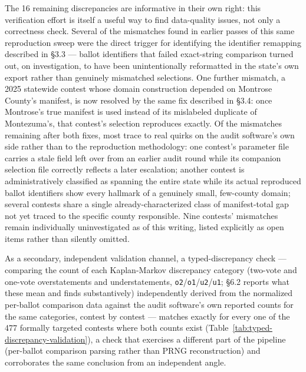 The 16 remaining discrepancies are informative in their own right: this
verification effort is itself a useful way to find data-quality issues, not
only a correctness check. Several of the mismatches found in earlier passes
of this same reproduction sweep were the direct trigger for identifying the
identifier remapping described in §3.3 — ballot identifiers that failed
exact-string comparison turned out, on investigation, to have been
unintentionally reformatted in the state's own export rather than genuinely
mismatched selections. One further mismatch, a 2025 statewide contest whose
domain construction depended on Montrose County's manifest, is now resolved
by the same fix described in §3.4: once Montrose's true manifest is used
instead of its mislabeled duplicate of Montezuma's, that contest's selection
reproduces exactly. Of the mismatches remaining after both fixes, most
trace to real quirks on the audit software's own side rather than to the reproduction
methodology: one contest's parameter file carries a stale field left over
from an earlier audit round while its companion selection file correctly
reflects a later escalation; another contest is administratively classified
as spanning the entire state while its actual reproduced ballot identifiers
show every hallmark of a genuinely small, few-county domain; several
contests share a single already-characterized class of manifest-total gap
not yet traced to the specific county responsible. Nine contests' mismatches
remain individually uninvestigated as of this writing, listed explicitly as
open items rather than silently omitted.

As a secondary, independent validation channel, a typed-discrepancy check —
comparing the count of each Kaplan-Markov discrepancy category (two-vote
and one-vote overstatements and understatements, \texttt{o2}/\texttt{o1}/\texttt{u2}/\texttt{u1};
§6.2 reports what these mean and finds substantively) independently
derived from the normalized per-ballot comparison data against the audit
software's own reported counts for the same categories, contest by
contest — matches exactly for every one of the 477 formally targeted
contests where both counts exist (Table~\ref{tab:typed-discrepancy-validation}),
a check that exercises a different part of the pipeline (per-ballot
comparison parsing rather than PRNG reconstruction) and corroborates the
same conclusion from an independent angle.

\begin{table}[t]\centering
{}
\caption{Typed-discrepancy validation across just the 477 formally targeted contests: independently derived counts against CORLA's own reported counts, matching exactly. \label{tab:typed-discrepancy-validation}}
\end{table}

